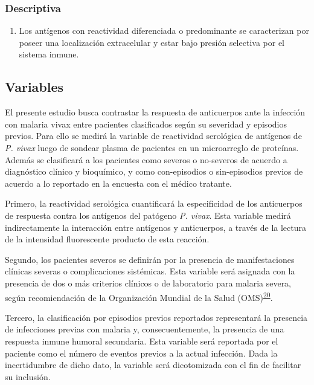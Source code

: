 \documentclass[]{article}
\providecommand{\tightlist}{%
  \setlength{\itemsep}{0pt}\setlength{\parskip}{0pt}}
\begin{document}
\subsubsection{Descriptiva}\label{descriptiva}

\begin{enumerate}
\def\labelenumi{\arabic{enumi}.}
\setcounter{enumi}{2}
\tightlist
\item
  Los antígenos con reactividad diferenciada o predominante se
  caracterizan por poseer una localización extracelular y estar bajo
  presión selectiva por el sistema inmune.
\end{enumerate}

\subsection{Variables}\label{variables}

El presente estudio busca contrastar la respuesta de anticuerpos ante la
infección con malaria vivax entre pacientes clasificados según su
severidad y episodios previos. Para ello se medirá la variable de
reactividad serológica de antígenos de \emph{P. vivax} luego de sondear
plasma de pacientes en un microarreglo de proteínas. Además se
clasificará a los pacientes como severos o no-severos de acuerdo a
diagnóstico clínico y bioquímico, y como con-episodios o sin-episodios
previos de acuerdo a lo reportado en la encuesta con el médico tratante.

Primero, la reactividad serológica cuantificará la especificidad de los
anticuerpos de respuesta contra los antígenos del patógeno \emph{P.
vivax}. Esta variable medirá indirectamente la interacción entre
antígenos y anticuerpos, a través de la lectura de la intensidad
fluorescente producto de esta reacción.

Segundo, los pacientes severos se definirán por la presencia de
manifestaciones clínicas severas o complicaciones sistémicas. Esta
variable será asignada con la presencia de dos o más criterios clínicos
o de laboratorio para malaria severa, según recomiendación de la
Organización Mundial de la Salud
(OMS)\textsuperscript{\protect\hyperlink{ref-WHO2014severe}{20}}.

Tercero, la clasificación por episodios previos reportados representará
la presencia de infecciones previas con malaria y, consecuentemente, la
presencia de una respuesta inmune humoral secundaria. Esta variable será
reportada por el paciente como el número de eventos previos a la actual
infección. Dada la incertidumbre de dicho dato, la variable será
dicotomizada con el fin de facilitar su inclusión.
\end{document}
